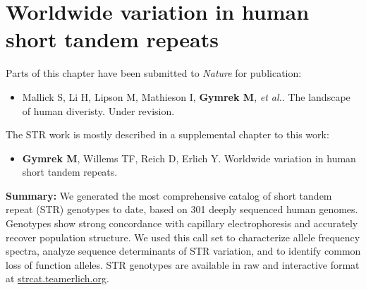 \chapter{Worldwide variation in human short tandem repeats}

\label{chap:sgdp}

\hzline

Parts of this chapter have been submitted to \emph{Nature} for publication:
\begin{itemize}
\item[] Mallick S, Li H, Lipson M, Mathieson I, \textbf{Gymrek M}, \emph{et al.}. The landscape of human diveristy. Under revision.
\end{itemize}
The STR work is mostly described in a supplemental chapter to this work:
\begin{itemize}
\item[] \textbf{Gymrek M}, Willems TF, Reich D, Erlich Y. Worldwide variation in human short tandem repeats. 
\end{itemize}
\hzline

\textbf{Summary:} We generated the most comprehensive catalog of short tandem repeat (STR) genotypes to date, based on 301 deeply sequenced human genomes. Genotypes show strong concordance with capillary electrophoresis and accurately recover population structure. We used this call set to characterize allele frequency spectra, analyze sequence determinants of STR variation, and to identify common loss of function alleles. STR genotypes are available in raw and interactive format at \url{strcat.teamerlich.org}.

